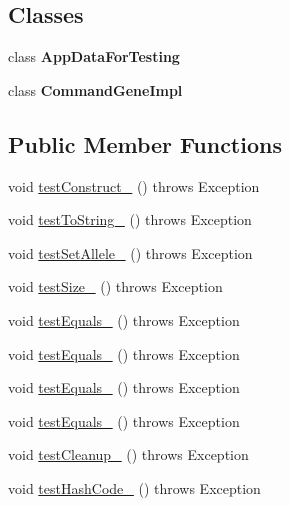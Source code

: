\subsection*{Classes}
\begin{DoxyCompactItemize}
\item 
class {\bfseries App\-Data\-For\-Testing}
\item 
class {\bfseries Command\-Gene\-Impl}
\end{DoxyCompactItemize}
\subsection*{Public Member Functions}
\begin{DoxyCompactItemize}
\item 
void \hyperlink{classorg_1_1jgap_1_1gp_1_1_command_gene_test_a59742c60a1d496aa7516981a35126ceb}{test\-Construct\-\_} ()  throws Exception 
\item 
void \hyperlink{classorg_1_1jgap_1_1gp_1_1_command_gene_test_abe2c24c6b64fff282225cc281f4de641}{test\-To\-String\-\_} ()  throws Exception 
\item 
void \hyperlink{classorg_1_1jgap_1_1gp_1_1_command_gene_test_ae26df00578f6aa0ec4c3eae05154eaa2}{test\-Set\-Allele\-\_} ()  throws Exception 
\item 
void \hyperlink{classorg_1_1jgap_1_1gp_1_1_command_gene_test_af284bd7f014574b75c32886aa811b9fd}{test\-Size\-\_} ()  throws Exception 
\item 
void \hyperlink{classorg_1_1jgap_1_1gp_1_1_command_gene_test_a139988fda1f0542462946f88754dd252}{test\-Equals\-\_} ()  throws Exception 
\item 
void \hyperlink{classorg_1_1jgap_1_1gp_1_1_command_gene_test_af0d612ca5c1e13ec66f32bf60fbade6c}{test\-Equals\-\_} ()  throws Exception 
\item 
void \hyperlink{classorg_1_1jgap_1_1gp_1_1_command_gene_test_ac2664619b811263bd5d6b65ba8c3b7ec}{test\-Equals\-\_} ()  throws Exception 
\item 
void \hyperlink{classorg_1_1jgap_1_1gp_1_1_command_gene_test_a670aa7b5c2021f31a719ea32218d6671}{test\-Equals\-\_} ()  throws Exception 
\item 
void \hyperlink{classorg_1_1jgap_1_1gp_1_1_command_gene_test_a5516711a9ca6f41349793408dc64fd42}{test\-Cleanup\-\_} ()  throws Exception 
\item 
void \hyperlink{classorg_1_1jgap_1_1gp_1_1_command_gene_test_ab08d9ee8333848f7eb1718a3e731cd72}{test\-Hash\-Code\-\_} ()  throws Exception 

\end{DoxyCompactItemize}
